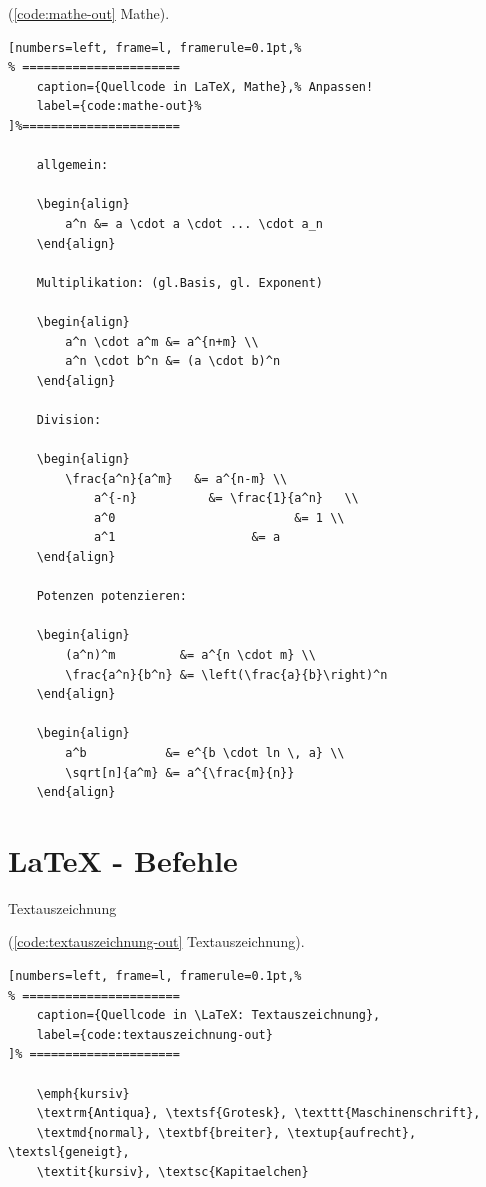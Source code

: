 (\autoref{code:mathe-out} Mathe).
\lstset{language=[LaTeX]TeX} %
\begin{lstlisting}[numbers=left, frame=l, framerule=0.1pt,%
% ======================
	caption={Quellcode in LaTeX, Mathe},% Anpassen!
	label={code:mathe-out}%
]%======================

	allgemein:

	\begin{align}
		a^n &= a \cdot a \cdot ... \cdot a_n
	\end{align}

	Multiplikation: (gl.Basis, gl. Exponent)

	\begin{align}
		a^n \cdot a^m &= a^{n+m} \\
		a^n \cdot b^n &= (a \cdot b)^n
	\end{align}

	Division:

	\begin{align}
		\frac{a^n}{a^m}   &= a^{n-m} \\
			a^{-n}          &= \frac{1}{a^n}   \\
			a^0 						&= 1 \\
			a^1				      &= a
	\end{align}

	Potenzen potenzieren:

	\begin{align}
		(a^n)^m         &= a^{n \cdot m} \\
		\frac{a^n}{b^n} &= \left(\frac{a}{b}\right)^n
	\end{align}

	\begin{align}
		a^b           &= e^{b \cdot ln \, a} \\
		\sqrt[n]{a^m} &= a^{\frac{m}{n}}
	\end{align}
\end{lstlisting}

\newpage %

\section{LaTeX - Befehle}

Textauszeichnung

(\autoref{code:textauszeichnung-out} Textauszeichnung).
\lstset{language=[LaTeX]TeX} %
\begin{lstlisting}[numbers=left, frame=l, framerule=0.1pt,%
% ======================
	caption={Quellcode in \LaTeX: Textauszeichnung},
	label={code:textauszeichnung-out}
]% =====================

	\emph{kursiv}
	\textrm{Antiqua}, \textsf{Grotesk}, \texttt{Maschinenschrift},
	\textmd{normal}, \textbf{breiter}, \textup{aufrecht}, \textsl{geneigt},
	\textit{kursiv}, \textsc{Kapitaelchen}
\end{lstlisting}

